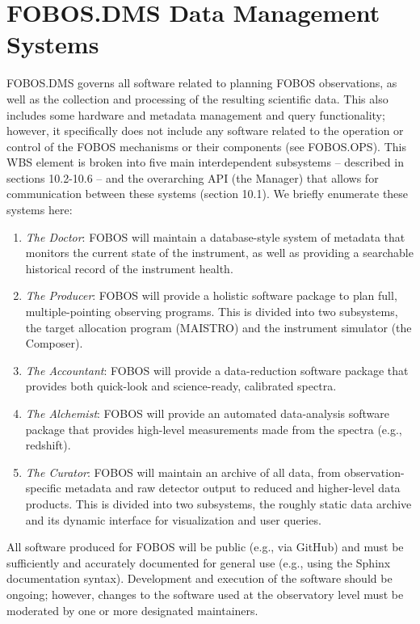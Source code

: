 \documentclass[oneside,11pt]{amsart}
\begin{document}
\section{FOBOS.DMS Data Management Systems}

FOBOS.DMS governs all software related to planning FOBOS
observations, as well as the collection and processing of the
resulting scientific data. This also includes some hardware and
metadata management and query functionality; however, it specifically
does not include any software related to the operation or control of
the FOBOS mechanisms or their components (see FOBOS.OPS). This WBS
element is broken into five main interdependent subsystems –
described in sections 10.2-10.6 – and the overarching API (the
Manager) that allows for communication between these systems (section
10.1). We briefly enumerate these systems here:

\begin{enumerate}

\item {\it The Doctor}: FOBOS will maintain a database-style system
of metadata that monitors the current state of the instrument, as
well as providing a searchable historical record of the instrument
health.

\item {\it The Producer}: FOBOS will provide a holistic software
package to plan full, multiple-pointing observing programs. This is
divided into two subsystems, the target allocation program (MAISTRO)
and the instrument simulator (the Composer).

\item {\it The Accountant}: FOBOS will provide a data-reduction
software package that provides both quick-look and science-ready,
calibrated spectra.

\item {\it The Alchemist}: FOBOS will provide an automated
data-analysis software package that provides high-level measurements
made from the spectra (e.g., redshift).

\item {\it The Curator}: FOBOS will maintain an archive of all data,
from observation-specific metadata and raw detector output to reduced
and higher-level data products. This is divided into two subsystems,
the roughly static data archive and its dynamic interface for
visualization and user queries.

\end{enumerate}

All software produced for FOBOS will be public (e.g., via GitHub) and
must be sufficiently and accurately documented for general use (e.g.,
using the Sphinx documentation syntax). Development and execution of
the software should be ongoing; however, changes to the software used
at the observatory level must be moderated by one or more designated
maintainers.
\end{document}
